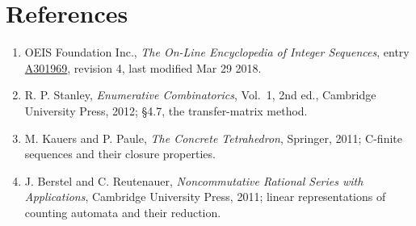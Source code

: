 \documentclass[11pt]{article}
\theoremstyle{definition}
\begin{document}
\section{References}

\begin{enumerate}

\item OEIS Foundation Inc., \emph{The On-Line Encyclopedia of Integer Sequences}, entry \href{https://oeis.org/A301969}{A301969}, revision 4, last modified Mar 29 2018.

\item R. P. Stanley, \emph{Enumerative Combinatorics}, Vol.~1, 2nd ed., Cambridge University Press, 2012; \S4.7, the transfer-matrix method.

\item M. Kauers and P. Paule, \emph{The Concrete Tetrahedron}, Springer, 2011; C-finite sequences and their closure properties.

\item J. Berstel and C. Reutenauer, \emph{Noncommutative Rational Series with Applications}, Cambridge University Press, 2011; linear representations of counting automata and their reduction.

\end{enumerate}
\end{document}
